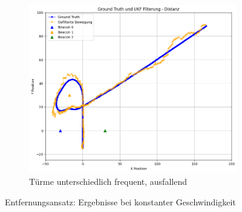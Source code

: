 \begin{figure}
\begin{subfigure}{.333\textwidth}
        \includegraphics[width=.9\linewidth]{Ergebnisse/plots_fahrten/distanz/distanz_dyn_acc_flag_freq.png}
        \caption{Türme unterschiedlich frequent, ausfallend}
    \end{subfigure}
    \caption{Entfernungsansatz: Ergebnisse bei konstanter Geschwindigkeit}
\end{figure}